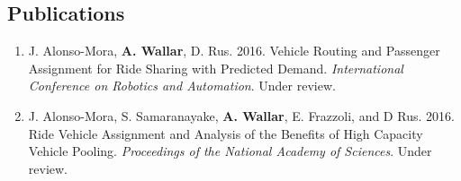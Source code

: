 \documentclass[line,margin]{cv}
\begin{document}
\begin{resume}
%
%
%
%
%
%
%
\section{Publications}

\begin{enumerate}

    \item J. Alonso-Mora, \textbf{A. Wallar}, D. Rus. 2016. Vehicle Routing and
        Passenger Assignment for Ride Sharing with Predicted Demand.
        \textit{International Conference on Robotics and Automation}.
        Under review.

    \item J. Alonso-Mora, S. Samaranayake, \textbf{A. Wallar},
        E. Frazzoli, and D Rus. 2016. Ride Vehicle Assignment
        and Analysis of the Benefits of High Capacity Vehicle Pooling.
        \textit{Proceedings of the National Academy of Sciences}. Under review.


\end{enumerate}
\end{resume}
\end{document}

